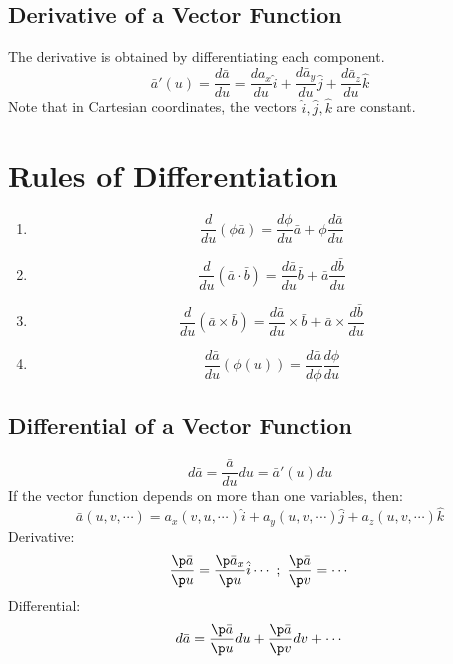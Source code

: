 \documentclass[a4paper, 11pt, normalem]{report}
\begin{document}
\subsection{Derivative of a Vector Function}
The derivative is obtained by differentiating each component.
\begin{equation*}
    \bar{a}'(u) = \frac{d\bar{a}}{du} = \frac{da_x}{du}\hat{i} + \frac{d\bar{a}_y}{du}\hat{j} + \frac{d\bar{a}_z}{du}\hat{k}
\end{equation*}
Note that in Cartesian coordinates, the vectors $\hat{i}, \hat{j}, \hat{k}$ are constant.

\section{Rules of Differentiation}
\begin{enumerate}
    \item   \begin{equation*}
                \frac{d}{du}(\phi \bar{a}) = \frac{d\phi}{du}\bar{a} + \phi \frac{d\bar{a}}{du}
            \end{equation*}
    \item   \begin{equation*}
                \frac{d}{du}(\bar{a} \cdot \bar{b}) = \frac{d\bar{a}}{du}\bar{b} + \bar{a}\frac{d\bar{b}}{du}
            \end{equation*}
    \item   \begin{equation*}
                \frac{d}{du}(\bar{a} \times \bar{b}) = \frac{d\bar{a}}{du} \times \bar{b} + \bar{a} \times \frac{d\bar{b}}{du}
            \end{equation*}
    \item   \begin{equation*}
                \frac{d\bar{a}}{du}(\phi(u)) = \frac{d\bar{a}}{d\phi}\frac{d\phi}{du}
            \end{equation*}
\end{enumerate}

\subsection{Differential of a Vector Function}
\begin{equation*}
    d\bar{a} = \frac{\bar{a}}{du}du = \bar{a}'(u)du
\end{equation*}
If the vector function depends on more than one variables, then:
\begin{equation*}
    \bar{a}(u,v,\cdots) = a_x (v, u, \cdots) \hat{i} + a_y (u, v, \cdots) \hat{j} + a_z (u, v, \cdots)\hat{k}
\end{equation*}
Derivative:
\begin{equation*}
    \frac{\p \bar{a}}{\p u} = \frac{\p \bar{a}_x}{\p u}\hat{i} \cdots ~;~ \frac{\p \bar{a}}{\p v} = \cdots
\end{equation*}
Differential:
\begin{equation*}
    d\bar{a} = \frac{\p \bar{a}}{\p u} du + \frac{\p \bar{a}}{\p v}dv + \cdots
\end{equation*}
\end{document}
